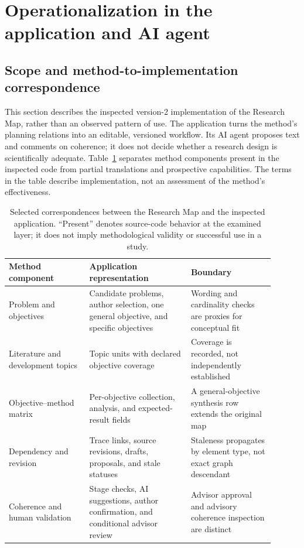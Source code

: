 \section{Operationalization in the application and AI agent}
\label{sec:system}

\subsection{Scope and method-to-implementation correspondence}

This section describes the inspected version-2 implementation of the Research Map, rather than an observed pattern of use. The application turns the method's planning relations into an editable, versioned workflow. Its AI agent proposes text and comments on coherence; it does not decide whether a research design is scientifically adequate. Table~\ref{tab:method-system} separates method components present in the inspected code from partial translations and prospective capabilities. The terms in the table describe implementation, not an assessment of the method's effectiveness.

\begin{table}[htbp]
\centering
\small
\caption{Selected correspondences between the Research Map and the inspected application. ``Present'' denotes source-code behavior at the examined layer; it does not imply methodological validity or successful use in a study.}
\label{tab:method-system}
\begin{tabular}{>{\raggedright\arraybackslash}p{0.27\linewidth} >{\raggedright\arraybackslash}p{0.34\linewidth} >{\raggedright\arraybackslash}p{0.29\linewidth}}
\hline
Method component & Application representation & Boundary \\
\hline
Problem and objectives & Candidate problems, author selection, one general objective, and specific objectives & Wording and cardinality checks are proxies for conceptual fit \\
Literature and development topics & Topic units with declared objective coverage & Coverage is recorded, not independently established \\
Objective--method matrix & Per-objective collection, analysis, and expected-result fields & A general-objective synthesis row extends the original map \\
Dependency and revision & Trace links, source revisions, drafts, proposals, and stale statuses & Staleness propagates by element type, not exact graph descendant \\
Coherence and human validation & Stage checks, AI suggestions, author confirmation, and conditional advisor review & Advisor approval and advisory coherence inspection are distinct \\
\hline
\end{tabular}
\end{table}

